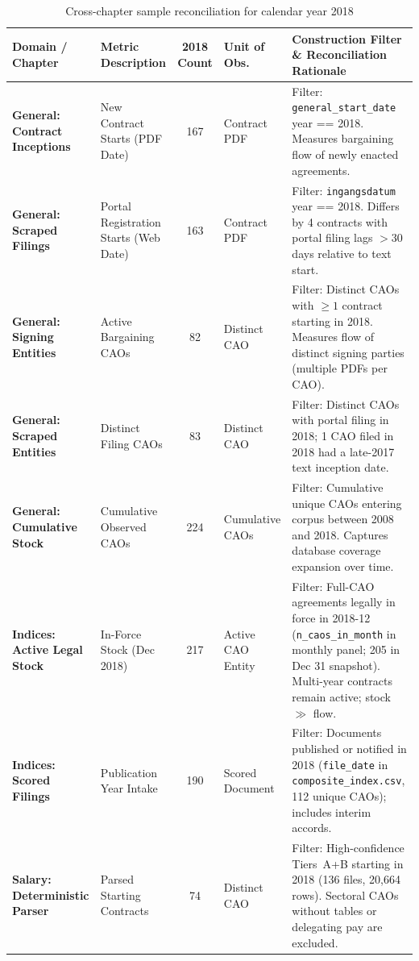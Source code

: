 \begin{table}[H]
    \centering
    \caption{Cross-chapter sample reconciliation for calendar year 2018}
    \label{tab:app_reconciliation_2018}
    \footnotesize
    \begin{tabular}{p{2.5cm}p{2.3cm}cp{1.8cm}p{5.5cm}}
        \hline\hline
        Domain / Chapter & Metric Description & 2018 Count & Unit of Obs. & Construction Filter \& Reconciliation Rationale \\
        \hline
        \textbf{General: Contract Inceptions} & New Contract Starts (PDF Date) & 167 & Contract PDF & Filter: \nolinkurl{general_start_date} year == 2018. Measures bargaining flow of newly enacted agreements. \\
        \textbf{General: Scraped Filings} & Portal Registration Starts (Web Date) & 163 & Contract PDF & Filter: \nolinkurl{ingangsdatum} year == 2018. Differs by 4 contracts with portal filing lags $>30$ days relative to text start. \\
        \textbf{General: Signing Entities} & Active Bargaining CAOs & 82 & Distinct CAO & Filter: Distinct CAOs with $\ge 1$ contract starting in 2018. Measures flow of distinct signing parties (multiple PDFs per CAO). \\
        \textbf{General: Scraped Entities} & Distinct Filing CAOs & 83 & Distinct CAO & Filter: Distinct CAOs with portal filing in 2018; 1 CAO filed in 2018 had a late-2017 text inception date. \\
        \textbf{General: Cumulative Stock} & Cumulative Observed CAOs & 224 & Cumulative CAOs & Filter: Cumulative unique CAOs entering corpus between 2008 and 2018. Captures database coverage expansion over time. \\
        \textbf{Indices: Active Legal Stock} & In-Force Stock (Dec 2018) & 217 & Active CAO Entity & Filter: Full-CAO agreements legally in force in 2018-12 (\nolinkurl{n_caos_in_month} in monthly panel; 205 in Dec 31 snapshot). Multi-year contracts remain active; stock $\gg$ flow. \\
        \textbf{Indices: Scored Filings} & Publication Year Intake & 190 & Scored Document & Filter: Documents published or notified in 2018 (\nolinkurl{file_date} in \nolinkurl{composite_index.csv}, 112 unique CAOs); includes interim accords. \\
        \textbf{Salary: Deterministic Parser} & Parsed Starting Contracts & 74 & Distinct CAO & Filter: High-confidence Tiers~A+B starting in 2018 (136 files, 20,664 rows). Sectoral CAOs without tables or delegating pay are excluded. \\

\end{tabular}
\end{table}
